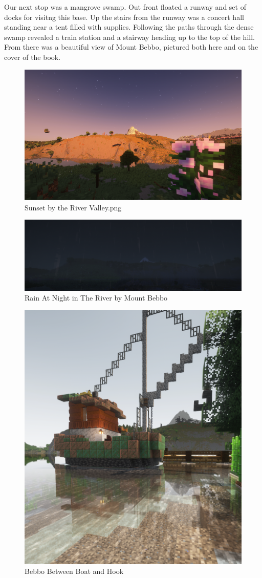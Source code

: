 Our next stop was a mangrove swamp. Out front floated a runway and set of docks for visitng this base. Up the stairs from the runway was a concert hall standing near a tent filled with supplies. Following the paths through the dense swamp revealed a train station and a stairway heading up to the top of the hill. From there was a beautiful view of Mount Bebbo, pictured both here and on the cover of the book.

\begin{figure}[H]
	\centering
	\includegraphics[width=\linewidth]{Sunset by the River Valley.png}
	\caption{Sunset by the River Valley.png}
\end{figure}

\begin{figure}[H]
	\centering
	\includegraphics[width=1.1\linewidth]{Rain At Night in The River by Mount Bebbo.png}
	\caption{Rain At Night in The River by Mount Bebbo}
\end{figure}

\begin{figure}[H]
	\centering
	\includegraphics[width=0.6\linewidth]{Tugboat.png}
	\caption{Bebbo Between Boat and Hook}
\end{figure}

